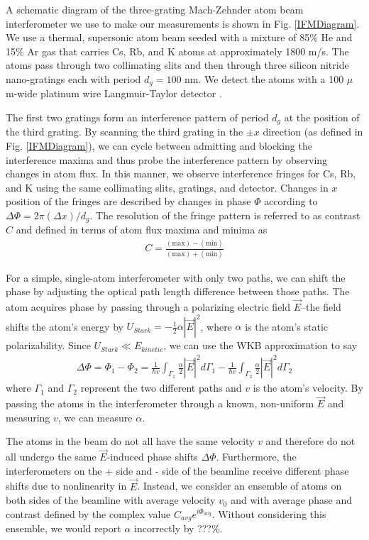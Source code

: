 \documentclass[twocolumn,prl,showpacs,superscriptaddress]{revtex4-1}   %
\newcommand{\abs}[1]{\left|#1\right|}
\newcommand{\figref}[1]{Fig. \ref{#1}}
\begin{document}
A schematic diagram of the three-grating Mach-Zehnder atom beam interferometer we use to make our measurements is shown in \figref{IFMDiagram}. We use a thermal, supersonic atom beam \cite{Scoles} seeded with a mixture of 85\% He and 15\% Ar gas that carries Cs, Rb, and K atoms at approximately 1800 m/s. 
The atoms pass through two collimating slits and then through three silicon nitride nano-gratings each with period $d_g = 100$ nm. We detect the atoms with a 100 $\mu$m-wide platinum wire Langmuir-Taylor detector \cite{Delhuille2002}.

The first two gratings form an interference pattern of period $d_g$ at the position of the third grating. By scanning the third grating in the $\pm x$ direction (as defined in \figref{IFMDiagram}), we can cycle between admitting and blocking the interference maxima and thus probe the interference pattern by observing changes in atom flux. In this manner, we observe interference fringes for Cs, Rb, and K using the same collimating slits, gratings, and detector. Changes in $x$ position of the fringes are described by changes in phase $\Phi$ according to $\Delta\Phi = 2\pi(\Delta x)/d_g$. The resolution of the fringe pattern is referred to as contrast $C$ and defined in terms of atom flux maxima and minima as
\begin{align}
	C = \frac{(\mathrm{max}) - (\mathrm{min})}{(\mathrm{max}) + (\mathrm{min})}
	\label{contrastDef}
\end{align}

For a simple, single-atom interferometer with only two paths, we can shift the phase by adjusting the optical path length difference between those paths. The atom acquires phase by passing through a polarizing electric field $\vec{E}$--the field shifts the atom's energy by $U_{Stark} = -\frac{1}{2}\alpha\abs{\vec{E}}^2$, where $\alpha$ is the atom's static polarizability. Since $U_{Stark} \ll E_{kinetic}$, we can use the WKB approximation to say
\begin{align}
	\Delta\Phi = \Phi_1 - \Phi_2 =
	\frac{1}{\hbar v} \int_{\Gamma_1} \frac{\alpha}{2}|\vec{E}|^2 d\Gamma_1 -
	\frac{1}{\hbar v} \int_{\Gamma_2} \frac{\alpha}{2}|\vec{E}|^2 d\Gamma_2
	\label{deltaPhaseGeneral}
\end{align}
where $\Gamma_1$ and $\Gamma_2$ represent the two different paths and $v$ is the atom's velocity. By passing the atoms in the interferometer through a known, non-uniform $\vec{E}$ and measuring $v$, we can measure $\alpha$.

The atoms in the beam do not all have the same velocity $v$ and therefore do not all undergo the same $\vec{E}$-induced phase shifts $\Delta\Phi$. Furthermore, the interferometers on the + side and - side of the beamline receive different phase shifts due to nonlinearity in $\vec{E}$. Instead, we consider an ensemble of atoms on both sides of the beamline with average velocity $v_0$ and with average phase and contrast defined by the complex value $C_{avg}e^{i\Phi_{avg}}$. Without considering this ensemble, we would report $\alpha$ incorrectly by ???\%.
\end{document}
